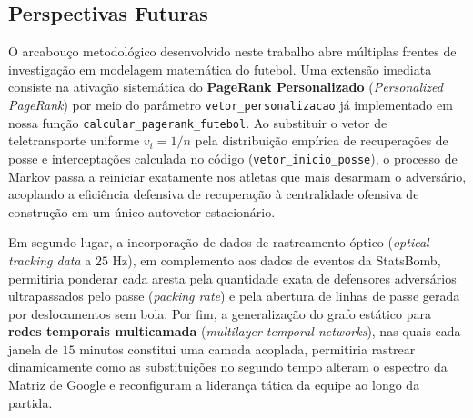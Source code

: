 \documentclass[10pt,a4paper]{article}
\theoremstyle{definition}
\theoremstyle{plain}
\theoremstyle{remark}
\begin{document}
\subsection{\sffamily Perspectivas Futuras}

O arcabouço metodológico desenvolvido neste trabalho abre múltiplas frentes de investigação em modelagem matemática do futebol. Uma extensão imediata consiste na ativação sistemática do \textbf{PageRank Personalizado} (\textit{Personalized PageRank}) por meio do parâmetro \texttt{vetor\_personalizacao} já implementado em nossa função \texttt{calcular\_pagerank\_futebol}. Ao substituir o vetor de teletransporte uniforme $v_i = 1/n$ pela distribuição empírica de recuperações de posse e interceptações calculada no código (\texttt{vetor\_inicio\_posse}), o processo de Markov passa a reiniciar exatamente nos atletas que mais desarmam o adversário, acoplando a eficiência defensiva de recuperação à centralidade ofensiva de construção em um único autovetor estacionário.

Em segundo lugar, a incorporação de dados de rastreamento óptico (\textit{optical tracking data} a $25$ Hz), em complemento aos dados de eventos da StatsBomb, permitiria ponderar cada aresta pela quantidade exata de defensores adversários ultrapassados pelo passe (\textit{packing rate}) e pela abertura de linhas de passe gerada por deslocamentos sem bola. Por fim, a generalização do grafo estático para \textbf{redes temporais multicamada} (\textit{multilayer temporal networks}), nas quais cada janela de $15$ minutos constitui uma camada acoplada, permitiria rastrear dinamicamente como as substituições no segundo tempo alteram o espectro da Matriz de Google e reconfiguram a liderança tática da equipe ao longo da partida.
\end{document}
